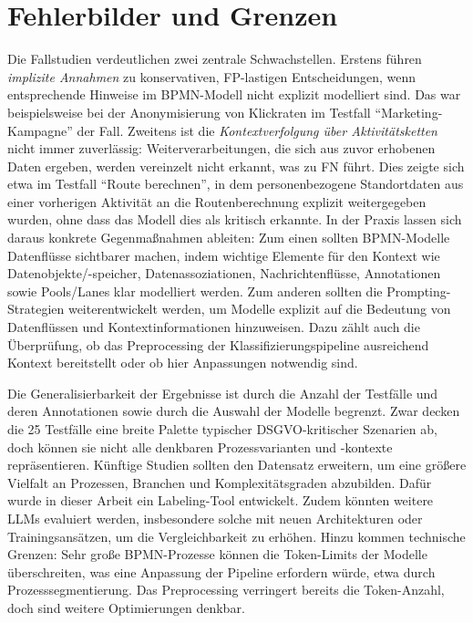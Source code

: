 \section{Fehlerbilder und Grenzen}\label{sec:fehlerbilder-und-grenzen}

Die Fallstudien verdeutlichen zwei zentrale Schwachstellen. Erstens führen \emph{implizite Annahmen} zu konservativen, \ac{FP}-lastigen Entscheidungen, wenn entsprechende Hinweise im \ac{BPMN}-Modell nicht explizit modelliert sind. Das war beispielsweise bei der Anonymisierung von Klickraten im Testfall \enquote{Marketing-Kampagne} der Fall. Zweitens ist die \emph{Kontextverfolgung über Aktivitätsketten} nicht immer zuverlässig: Weiterverarbeitungen, die sich aus zuvor erhobenen Daten ergeben, werden vereinzelt nicht erkannt, was zu \ac{FN} führt. Dies zeigte sich etwa im Testfall \enquote{Route berechnen}, in dem personenbezogene Standortdaten aus einer vorherigen Aktivität an die Routenberechnung explizit weitergegeben wurden, ohne dass das Modell dies als kritisch erkannte. In der Praxis lassen sich daraus konkrete Gegenmaßnahmen ableiten: Zum einen sollten \ac{BPMN}-Modelle Datenflüsse sichtbarer machen, indem wichtige Elemente für den Kontext wie Datenobjekte/-speicher, Datenassoziationen, Nachrichtenflüsse, Annotationen sowie Pools/Lanes klar modelliert werden. Zum anderen sollten die Prompting-Strategien weiterentwickelt werden, um Modelle explizit auf die Bedeutung von Datenflüssen und Kontextinformationen hinzuweisen. Dazu zählt auch die Überprüfung, ob das Preprocessing der Klassifizierungspipeline ausreichend Kontext bereitstellt oder ob hier Anpassungen notwendig sind.

Die Generalisierbarkeit der Ergebnisse ist durch die Anzahl der Testfälle und deren Annotationen sowie durch die Auswahl der Modelle begrenzt. Zwar decken die 25 Testfälle eine breite Palette typischer \ac{DSGVO}-kritischer Szenarien ab, doch können sie nicht alle denkbaren Prozessvarianten und -kontexte repräsentieren. Künftige Studien sollten den Datensatz erweitern, um eine größere Vielfalt an Prozessen, Branchen und Komplexitätsgraden abzubilden. Dafür wurde in dieser Arbeit ein Labeling-Tool entwickelt. Zudem könnten weitere \acp{LLM} evaluiert werden, insbesondere solche mit neuen Architekturen oder Trainingsansätzen, um die Vergleichbarkeit zu erhöhen. Hinzu kommen technische Grenzen: Sehr große \ac{BPMN}-Prozesse können die Token-Limits der Modelle überschreiten, was eine Anpassung der Pipeline erfordern würde, etwa durch Prozesssegmentierung. Das Preprocessing verringert bereits die Token-Anzahl, doch sind weitere Optimierungen denkbar.

